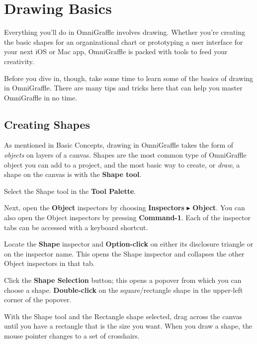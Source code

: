 \documentclass[../main.tex]{subfiles}
\begin{document}
\chapter{Drawing Basics}

Everything you'll do in OmniGraffle involves drawing. Whether you're creating the basic shapes
for an organizational chart or prototyping a user interface for your next iOS or Mac app,
OmniGraffle is packed with tools to feed your creativity.

Before you dive in, though, take some time to learn some of the basics of drawing in
OmniGraffle. There are many tips and tricks here that can help you master OmniGraffle in no
time.

\section{Creating Shapes}

As mentioned in Basic Concepts, drawing in OmniGraffle takes the form of \textit{objects} on
layers of a canvas. Shapes are the most common type of OmniGraffle object you can add to a
project, and the most basic way to create, or \textit{draw}, a shape on the canvas is with the
\textbf{Shape tool}.

Select the Shape tool in the \textbf{Tool Palette}.


Next, open the \textbf{Object} inspectors by choosing \textbf{Inspectors} $\blacktriangleright$
\textbf{Object}. You can also open the Object inspectors by pressing \textbf{Command-1}. Each
of the inspector tabs can be accessed with a keyboard shortcut.

Locate the \textbf{Shape} inspector and \textbf{Option-click} on either its disclosure triangle
or on the inspector name. This opens the Shape inspector and collapses the other Object
inspectors in that tab.


Click the \textbf{Shape Selection} button; this opens a popover from which you can choose a
shape. \textbf{Double-click} on the square/rectangle shape in the upper-left corner of the
popover.


With the Shape tool and the Rectangle shape selected, drag across the canvas until you have a
rectangle that is the size you want. When you draw a shape, the mouse pointer changes to a set
of crosshairs.
\end{document}
